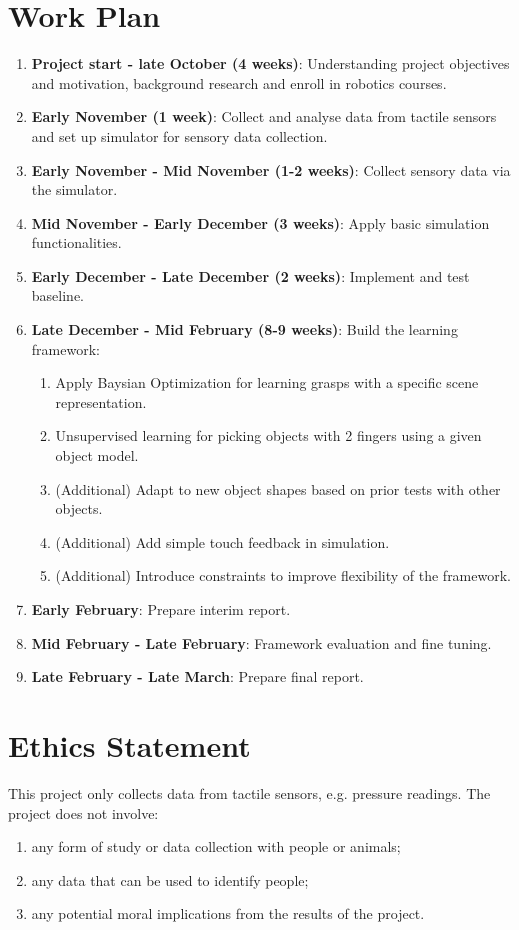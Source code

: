\documentclass{article}
\begin{document}
\section{Work Plan}
\begin{enumerate}
    \item\textbf{Project start - late October (4 weeks)}: Understanding project objectives and motivation, background research and enroll in robotics courses.
    \item\textbf{Early November (1 week)}: Collect and analyse data from tactile sensors and set up simulator for sensory data collection.
    \item\textbf{Early November - Mid November (1-2 weeks)}: Collect sensory data via the simulator.
    \item\textbf{Mid November - Early December (3 weeks)}: Apply basic simulation functionalities.
    \item\textbf{Early December - Late December (2 weeks)}: Implement and test baseline.
    \item\textbf{Late December - Mid February (8-9 weeks)}: Build the learning framework:
    \begin{enumerate}
        \item Apply Baysian Optimization for learning grasps with a specific scene representation.
        \item Unsupervised learning for picking objects with 2 fingers using a given object model.
        \item (Additional) Adapt to new object shapes based on prior tests with other objects.
        \item (Additional) Add simple touch feedback in simulation.
        \item (Additional) Introduce constraints to improve flexibility of the framework.
    \end{enumerate}
    \item\textbf{Early February}: Prepare interim report.
    \item\textbf{Mid February - Late February}: Framework evaluation and fine tuning.
    \item\textbf{Late February - Late March}: Prepare final report.
\end{enumerate}

\section{Ethics Statement}
This project only collects data from tactile sensors, e.g. pressure readings. The project does not involve:
\begin{enumerate}
    \item any form of study or data collection with people or animals;
    \item any data that can be used to identify people;
    \item any potential moral implications from the results of the project.
\end{enumerate}
\end{document}

